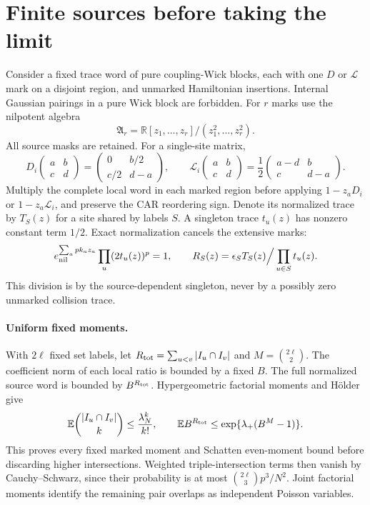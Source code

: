 \documentclass[11pt]{article}
\newcommand{\EE}{\mathbb E}
\newcommand{\LL}{\mathcal L}
\begin{document}
\newpage
\section{Finite sources before taking the limit}
Consider a fixed trace word of pure coupling-Wick blocks, each with
one $D$ or $\LL$ mark on a disjoint region, and unmarked Hamiltonian
insertions. Internal Gaussian pairings in a pure Wick block are
forbidden. For $r$ marks use the nilpotent algebra
\begin{equation}
 \mathfrak A_r=\mathbb R[z_1,\ldots,z_r]/(z_1^2,\ldots,z_r^2).
\end{equation}
All source masks are retained. For a single-site matrix,
\begin{equation}
 D_i\begin{pmatrix}a&b\\c&d\end{pmatrix}
 =\begin{pmatrix}0&b/2\\c/2&d-a\end{pmatrix},\qquad
 \LL_i\begin{pmatrix}a&b\\c&d\end{pmatrix}
 =\frac12\begin{pmatrix}a-d&b\\c&d-a\end{pmatrix}.
\end{equation}
Multiply the complete local word in each marked region before applying
$1-z_aD_i$ or $1-z_a\LL_i$, and preserve the CAR reordering sign.
Denote its normalized trace by $T_S(z)$ for a site shared by labels $S$.
A singleton trace $t_u(z)$ has nonzero constant term $1/2$. Exact
normalization cancels the extensive marks:
\begin{equation}
 e_{\rm nil}^{\sum_a pk_az_a}\prod_u(2t_u(z))^p=1,
 \qquad R_S(z)=\epsilon_ST_S(z)\Big/\prod_{u\in S}t_u(z).
 \label{single}
\end{equation}
This division is by the source-dependent singleton, never by a
possibly zero unmarked collision trace.

\paragraph{Uniform fixed moments.}
With $2\ell$ fixed set labels, let
$R_{\rm tot}=\sum_{u<v}|I_u\cap I_v|$ and $M=\binom{2\ell}{2}$.
The coefficient norm of each local ratio is bounded by a fixed $B$.
The full normalized source word is bounded by $B^{R_{\rm tot}}$.
Hypergeometric factorial moments and H\"older give
\begin{equation}
 \EE\binom{|I_u\cap I_v|}{k}\le\frac{\lambda_N^k}{k!},
 \qquad \EE B^{R_{\rm tot}}
 \le \exp\{\lambda_+(B^M-1)\}.
\end{equation}
This proves every fixed marked moment and Schatten even-moment bound
before discarding higher intersections. Weighted triple-intersection
terms then vanish by Cauchy--Schwarz, since their probability is at
most $\binom{2\ell}{3}p^3/N^2$. Joint factorial moments identify the
remaining pair overlaps as independent Poisson variables.
\end{document}
